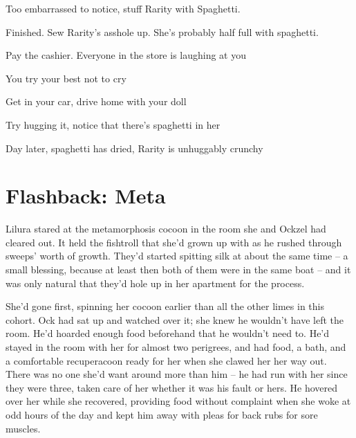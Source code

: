 \documentclass[a1paper]{article}
\begin{document}
\begin{multicols}{7}
{\textrangle \hspace{0.1em} Too embarrassed to notice, stuff Rarity with Spaghetti.

\textrangle \hspace{0.1em} Finished. Sew Rarity's asshole up. She's probably half full with spaghetti.

\textrangle \hspace{0.1em} Pay the cashier. Everyone in the store is laughing at you

\textrangle \hspace{0.1em} You try your best not to cry

\textrangle \hspace{0.1em} Get in your car, drive home with your doll

\textrangle \hspace{0.1em} Try hugging it, notice that there's spaghetti in her

\textrangle \hspace{0.1em} Day later, spaghetti has dried, Rarity is unhuggably crunchy


\setlength{\parskip}{0.8em}











\section{Flashback: Meta}
Lilura stared at the metamorphosis cocoon in the room she and Ockzel had cleared out.  It held the fishtroll that she'd grown up with as he rushed through sweeps' worth of growth.  They'd started spitting silk at about the same time – a small blessing, because at least then both of them were in the same boat – and it was only natural that they'd hole up in her apartment for the process.

She'd gone first, spinning her cocoon earlier than all the other limes in this cohort.  Ock had sat up and watched over it; she knew he wouldn't have left the room.  He'd hoarded enough food beforehand that he wouldn't need to.  He'd stayed in the room with her for almost two perigrees, and had food, a bath, and a comfortable recuperacoon ready for her when she clawed her her way out.  There was no one she'd want around more than him – he had run with her since they were three, taken care of her whether it was his fault or hers.  He hovered over her while she recovered, providing food without complaint when she woke at odd hours of the day and kept him away with pleas for back rubs for sore muscles.

}
\end{multicols}
\end{document}
